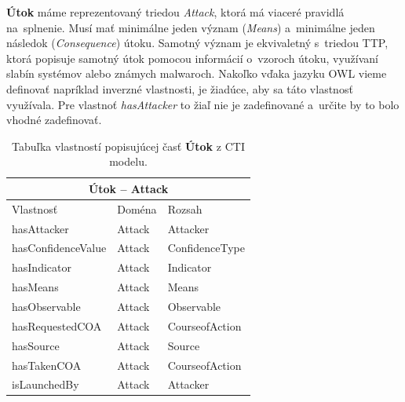 \documentclass[12pt, a4paper, oneside]{book}
\begin{document}
\textbf{Útok} máme reprezentovaný triedou \textit{Attack}, ktorá má viaceré pravidlá na~splnenie. Musí mať minimálne jeden význam (\textit{Means}) a~minimálne jeden následok (\textit{Consequence}) útoku. Samotný význam je ekvivaletný s~triedou TTP, ktorá popisuje samotný útok pomocou informácií o~vzoroch útoku, využívaní slabín systémov alebo známych malwaroch. Nakoľko vďaka jazyku OWL vieme definovať napríklad inverzné vlastnosti, je žiadúce, aby sa táto vlastnosť využívala. Pre vlastnoť \textit{hasAttacker} to žiaľ nie je zadefinované a~určite by to bolo vhodné zadefinovať.\\
%
%
\begin{table}[hbt!]
\centering
\begin{tabular}{ |p{5cm}||p{3cm}|p{3cm}|  }
 \hline
 \multicolumn{3}{|c|}{Útok -- Attack} \\
 \hline
 Vlastnosť & Doména & Rozsah\\
 \hline
 hasAttacker & Attack & Attacker\\
 hasConfidenceValue & Attack & ConfidenceType\\
 hasIndicator & Attack & Indicator\\
 hasMeans & Attack & Means\\
 hasObservable & Attack & Observable\\
 hasRequestedCOA & Attack & CourseofAction\\
 hasSource & Attack & Source\\
 hasTakenCOA & Attack & CourseofAction\\
 isLaunchedBy & Attack & Attacker\\
 \hline
\end{tabular}
\caption{Tabuľka vlastností popisujúcej časť \textbf{Útok} z CTI modelu.}
\label{tab:template}
\end{table}
\end{document}
